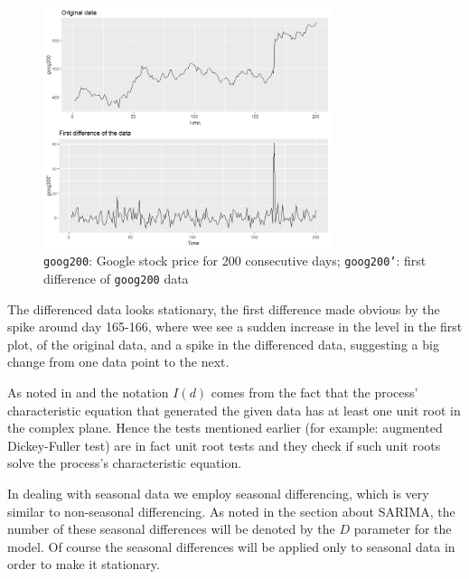 \documentclass[12pt,a4paper,titlepage]{report}
\begin{document}
\begin{figure}[h]
    \centering
    \includegraphics[width=0.75\textwidth]{ddiffgoog200}
    \caption{\texttt{goog200}: Google stock price for 200 consecutive days; \texttt{goog200'}: first difference of \texttt{goog200} data }
    \label{ddiffgoog200}
\end{figure}

The differenced data looks stationary, the first difference made obvious by the spike around day 165-166, where wee see a sudden increase in the level in the first plot, of the original data, and a spike in the differenced data, suggesting a big change from one data point to the next.

As noted in \cite{churvichunitroot} and \cite{nielsenunitroot} the notation $ I(d) $ comes from the fact that the process' characteristic equation that generated the given data has at least one unit root in the complex plane. Hence the tests mentioned earlier (for example: augmented Dickey-Fuller test) are in fact unit root tests and they check if such unit roots solve the process's characteristic equation.

In dealing with seasonal data we employ seasonal differencing, which is very similar to non-seasonal differencing.
As noted in the section about SARIMA, the number of these seasonal differences will be denoted by the $ D $ parameter for the model.
Of course the seasonal differences will be applied only to seasonal data in order to make it stationary.
\end{document}
